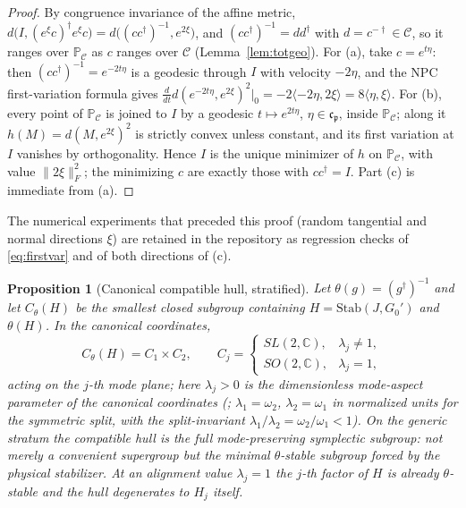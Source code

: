 \documentclass[11pt]{article}
\newtheorem{proposition}[theorem]{Proposition}
\theoremstyle{definition}
\theoremstyle{remark}
\newcommand{\C}{\mathbb{C}}
\newcommand{\w}{\omega}
\newcommand{\Stab}{\mathrm{Stab}}
\newcommand{\dg}{\dagger}
\begin{document}
\begin{proof}
By congruence invariance of the affine metric,
$d\big(I,(e^{\xi}c)^{\dg}e^{\xi}c\big)=d\big((cc^{\dg})^{-1},e^{2\xi}\big)$,
and $(cc^{\dg})^{-1}=dd^{\dg}$ with $d=c^{-\dg}\in\mathcal C$, so it
ranges over $\mathbb P_{\mathcal C}$ as $c$ ranges over $\mathcal C$
(Lemma~\ref{lem:totgeo}).  For (a), take $c=e^{t\eta}$: then
$(cc^{\dg})^{-1}=e^{-2t\eta}$ is a geodesic through $I$ with velocity
$-2\eta$, and the NPC first-variation formula gives
$\frac{d}{dt}d(e^{-2t\eta},e^{2\xi})^2\big|_0
=-2\langle-2\eta,2\xi\rangle=8\langle\eta,\xi\rangle$.
For (b), every point of $\mathbb P_{\mathcal C}$ is joined to $I$ by a
geodesic $t\mapsto e^{2t\eta}$, $\eta\in\mathfrak c_{\mathfrak p}$, inside
$\mathbb P_{\mathcal C}$; along it $h(M)=d(M,e^{2\xi})^2$ is strictly convex
unless constant, and its first variation at $I$ vanishes by orthogonality.
Hence $I$ is the unique minimizer of $h$ on $\mathbb P_{\mathcal C}$, with
value $\|2\xi\|_F^2$; the minimizing $c$ are exactly those with
$cc^{\dg}=I$.  Part (c) is immediate from (a).
\end{proof}

The numerical experiments that preceded this proof (random tangential and
normal directions $\xi$) are retained in the repository as regression
checks of \eqref{eq:firstvar} and of both directions of (c).

\begin{proposition}[Canonical compatible hull, stratified]\label{prop:hull}
Let $\theta(g)=(g^{\dg})^{-1}$ and let
$C_\theta(H)$ be the smallest closed subgroup containing
$H=\Stab(J,G_0')$ and $\theta(H)$.  In the canonical coordinates,
\begin{equation}
C_\theta(H)=C_1\times C_2,
\qquad
C_j=\begin{cases}
SL(2,\C), & \lambda_j\neq1,\\[1mm]
SO(2,\C), & \lambda_j=1 ,
\end{cases}
\end{equation}
acting on the $j$-th mode plane; here $\lambda_j>0$ is the dimensionless
mode-aspect parameter of the canonical coordinates
(\cite{companion}; $\lambda_1=\w_2$, $\lambda_2=\w_1$ in normalized units
for the symmetric split, with the split-invariant
$\lambda_1/\lambda_2=\w_2/\w_1<1$).  On the generic stratum the compatible
hull is the full mode-preserving symplectic subgroup: not merely a
convenient supergroup but the minimal $\theta$-stable subgroup forced by
the physical stabilizer.  At an alignment value $\lambda_j=1$ the $j$-th
factor of $H$ is already $\theta$-stable and the hull degenerates to $H_j$
itself.
\end{proposition}
\end{document}
